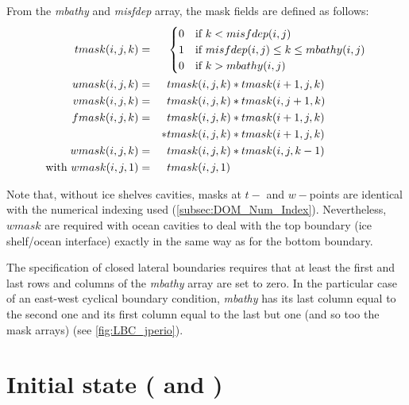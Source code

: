 \documentclass[../main/NEMO_manual]{subfiles}
\begin{document}
From the \textit{mbathy} and \textit{misfdep} array, the mask fields are defined as follows:
\begin{alignat*}{2}
  tmask(i,j,k) &= &  &
    \begin{cases}
                  0 &\text{if $                  k  <    misfdep(i,j)$} \\
                  1 &\text{if $misfdep(i,j) \leq k \leq   mbathy(i,j)$} \\
                  0 &\text{if $                  k  >     mbathy(i,j)$}
    \end{cases}
  \\
  umask(i,j,k) &= &  &tmask(i,j,k) * tmask(i + 1,j,    k) \\
  vmask(i,j,k) &= &  &tmask(i,j,k) * tmask(i    ,j + 1,k) \\
  fmask(i,j,k) &= &  &tmask(i,j,k) * tmask(i + 1,j,    k) \\
               &  &* &tmask(i,j,k) * tmask(i + 1,j,    k) \\
  wmask(i,j,k) &= &  &tmask(i,j,k) * tmask(i    ,j,k - 1) \\
  \text{with~} wmask(i,j,1) &= & &tmask(i,j,1)
\end{alignat*}

Note that, without ice shelves cavities,
masks at $t-$ and $w-$points are identical with the numerical indexing used (\autoref{subsec:DOM_Num_Index}).
Nevertheless, $wmask$ are required with ocean cavities to deal with the top boundary (ice shelf/ocean interface) 
exactly in the same way as for the bottom boundary.

The specification of closed lateral boundaries requires that at least
the first and last rows and columns of the \textit{mbathy} array are set to zero.
In the particular case of an east-west cyclical boundary condition, \textit{mbathy} has its last column equal to
the second one and its first column equal to the last but one (and so too the mask arrays)
(see \autoref{fig:LBC_jperio}).

\section{Initial state (\protect{} and \protect{})}
\label{sec:DTA_tsd}
\end{document}
